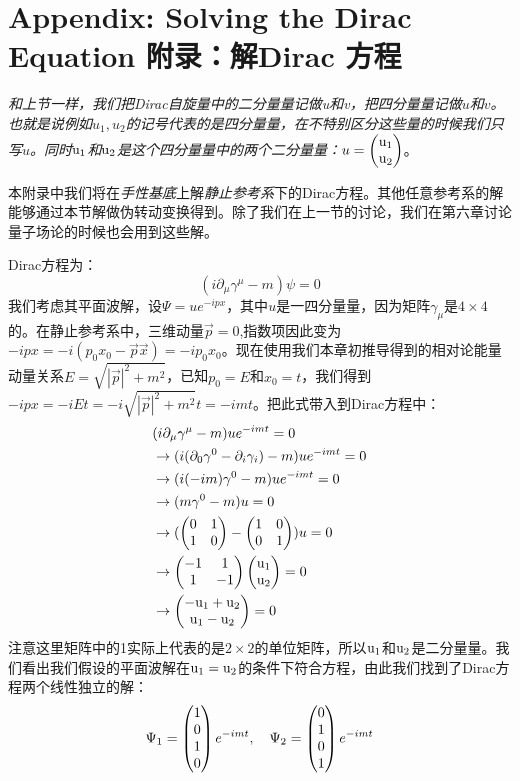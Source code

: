 \section[附录：解Dirac 方程]{Appendix: Solving the Dirac Equation 附录：解Dirac 方程}\label{sec8.9}
{\it 和上节一样，我们把Dirac自旋量中的二分量量记做{\rm u}和{\rm v}，把四分量量记做$u$和$v$。也就是说例如$u_1,u_2$的记号代表的是四分量量，在不特别区分这些量的时候我们只写$u$。同时${\rm u_1}$和${\rm u_2}$是这个四分量量中的两个二分量量：$u=\begin{pmatrix} \rm u_1 \\ \rm u_2 \end{pmatrix} $}。
\par
本附录中我们将在{\it 手性基底}上解{\it 静止参考系}下的Dirac方程。其他任意参考系的解能够通过本节解做伪转动变换得到。除了我们在上一节的讨论，我们在第六章讨论量子场论的时候也会用到这些解。\par
Dirac方程为：
\begin{equation}
(i\partial_\mu \gamma^\mu -m)\psi=0
\end{equation}
我们考虑其平面波解，设$\Psi=ue^{-ipx}$，其中$u$是一四分量量，因为矩阵$\gamma_\mu$是$4 \times 4$的。在静止参考系中，三维动量$\vec{p}=0$,指数项因此变为$-ipx=-i(p_0x_0-\vec{p}\vec{x})=-ip_0x_0$。现在使用我们本章初推导得到的相对论能量动量关系$E=\sqrt{|\vec{p}|^2+m^2}$，已知$p_0=E$和$x_0=t$，我们得到$-ipx=-iEt=-i\sqrt{|\vec{p}|^2+m^2}t=-imt$。把此式带入到Dirac方程中：
\begin{equation}
\begin{split}
&(i\partial_\mu\gamma^\mu-m)ue^{-imt}=0\\
&\to (i(\partial_0\gamma^0-\partial_i\gamma_i)-m)ue^{-imt}=0\\
&\to (i(-im)\gamma^0-m)ue^{-imt}=0\\
&\to (m\gamma^0-m)u=0\\
&\to (\begin{pmatrix} 0 & 1 \\ 1 & 0 \end{pmatrix} -\begin{pmatrix} 1 & 0 \\ 0 & 1 \end{pmatrix})u=0\\
&\to \begin{pmatrix} -1 & 1 \\ 1 & -1 \end{pmatrix} \begin{pmatrix} \rm u_1 \\ \rm u_2 \end{pmatrix} =0\\
&\to \begin{pmatrix} \rm -u_1+u_2 \\ \rm u_1-u_2 \end{pmatrix} =0
\end{split}
\end{equation}
注意这里矩阵中的1实际上代表的是$2 \times 2$的单位矩阵，所以$\rm u_1$和$\rm u_2$是二分量量。我们看出我们假设的平面波解在$\rm u_1 =u_2$的条件下符合方程，由此我们找到了Dirac方程两个线性独立的解：
\begin{equation}
\Psi_1=\begin{pmatrix} 1\\0\\1\\0 \end{pmatrix} e^{-imt},~~~\Psi_2=\begin{pmatrix} 0\\1\\0\\1 \end{pmatrix} e^{-imt}
\end{equation}
